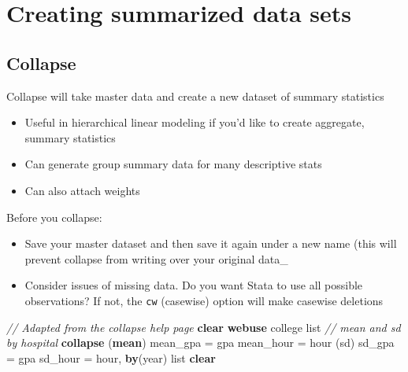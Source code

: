 \documentclass[]{book}
\newenvironment{Shaded}{\begin{snugshade}}{\end{snugshade}}
\newcommand{\CommentTok}[1]{\textcolor[rgb]{0.56,0.35,0.01}{\textit{#1}}}
\newcommand{\FunctionTok}[1]{\textcolor[rgb]{0.00,0.00,0.00}{#1}}
\newcommand{\KeywordTok}[1]{\textcolor[rgb]{0.13,0.29,0.53}{\textbf{#1}}}
\newcommand{\NormalTok}[1]{#1}
\newcommand{\OtherTok}[1]{\textcolor[rgb]{0.56,0.35,0.01}{#1}}
\providecommand{\tightlist}{%
  \setlength{\itemsep}{0pt}\setlength{\parskip}{0pt}}
\begin{document}
\hypertarget{creating-summarized-data-sets}{%
\section{Creating summarized data sets}\label{creating-summarized-data-sets}}

\hypertarget{collapse}{%
\subsection{Collapse}\label{collapse}}

Collapse will take master data and create a new dataset of summary statistics

\begin{itemize}
\tightlist
\item
  Useful in hierarchical linear modeling if you'd like to create aggregate, summary statistics
\item
  Can generate group summary data for many descriptive stats
\item
  Can also attach weights
\end{itemize}

Before you collapse:

\begin{itemize}
\tightlist
\item
  Save your master dataset and then save it again under a new name (this will prevent collapse from writing over your original data\_
\item
  Consider issues of missing data. Do you want Stata to use all possible observations? If not, the \texttt{cw} (casewise) option will make casewise deletions
\end{itemize}

\begin{Shaded}
\begin{Highlighting}[]
  \CommentTok{// Adapted from the collapse help page}
  \KeywordTok{clear}
  \KeywordTok{webuse}\NormalTok{ college}
  \OtherTok{list}
  \CommentTok{// mean and sd by hospital}
  \KeywordTok{collapse}\NormalTok{ (}\KeywordTok{mean}\NormalTok{) mean_gpa = gpa mean_hour = hour (}\FunctionTok{sd}\NormalTok{) sd_gpa = gpa sd_hour = hour, }\KeywordTok{by}\NormalTok{(}\FunctionTok{year}\NormalTok{)}
  \OtherTok{list}
  \KeywordTok{clear}
\end{Highlighting}
\end{Shaded}
\end{document}
